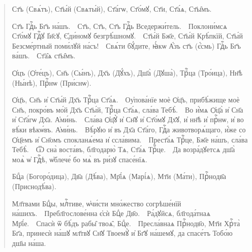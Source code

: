 \documentclass[11pt,a4paper,oneside]{memoir}
\newcommand{\exercise}{}
\newcommand{\exquote}{quote}
\newcommand{\pstyle}{\textenglish}
\newcommand{\pxp}[1]{\pstyle{(}#1\pstyle{)}}
\newcommand{\sdash}{\textenglish{\textemdash}}
\begin{document}
        \begin{\exquote}
          \begin{slv}
            Ст҃ъ \pxp{Свѧ́тъ}, Ст҃ы́й \pxp{Свѧты́й}, Ст҃а́гѡ,
            Ст҃о́мꙋ, Ст҃и, Ст҃а́ѧ, Ст҃ы̑мъ.

            Ст҃ъ Гдⷭ҇ь Бг҃ъ на́шъ.~\sdash~Ст҃ъ, Ст҃ъ, Ст҃ъ Гдⷭ҇ь
            Вседержи́тель.~\sdash~Поклони́мсѧ Ст҃о́мꙋ Гдⷭ҇ꙋ І҆и҃сꙋ,
            Є҆ди́номꙋ безгрѣ́шномꙋ.~\sdash~Ст҃ы́й Бж҃е, Ст҃ы́й
            Крѣ́пкїй, Ст҃ы́й Безсме́ртный поми́лꙋй
            на́съ!~\sdash~Свѧ́ти бꙋ́дите, ꙗ҆́кѡ А҆́зъ ст҃ъ
            \pxp{є҆́смь} Гдⷭ҇ь Бг҃ъ ва́шъ.~\sdash~Ст҃а̑ѧ ст҃ы̑мъ.

            Ѻ҆цъ \pxp{Ѻ҆те́цъ}, Сн҃ъ \pxp{Сы́нъ}, Дх҃ъ \pxp{Дꙋ́хъ},
            Дш҃а̀ \pxp{Дꙋша̀}, Трⷪ҇ца \pxp{Тро́ица}, Нн҃ѣ
            \pxp{Ны́нѣ}, Прⷭ҇нѡ \pxp{При́снѡ}.

            Ѻ҆ц҃ъ, Сн҃ъ и҆ Ст҃ы́й Дх҃ъ Трⷪ҇ца
            Ст҃а́ѧ.~\sdash~Оу҆пова́нїе моѐ Ѻ҆ц҃ъ, прибѣ́жище моѐ
            Сн҃ъ, покро́въ мо́й Дх҃ъ Ст҃ы́й, Трⷪ҇ца Ст҃а́ѧ, сла́ва
            Тебѣ̀.~\sdash~Во и҆́мѧ Ѻ҆ц҃а̀ и҆ Сн҃а и҆ Ст҃а́гѡ Дх҃а.
            А҆ми́нь.~\sdash~Сла́ва Ѻ҆ц҃ꙋ̀ и҆ Сн҃ꙋ и҆ Ст҃о́мꙋ Дх҃ꙋ, и҆
            нн҃ѣ и҆ прⷭ҇нѡ, и҆ во вѣ́ки вѣкѡ́въ.
            А҆ми́нь.~\sdash~Вѣ́рꙋю и҆ въ Дх҃а Ст҃а́го, Гдⷭ҇а
            животворѧ́щаго, и҆́же со Ѻ҆ц҃емъ и҆ Сн҃омъ спокланѧ́ема
            и҆ ссла́вима.~\sdash~Прест҃а́ѧ Трⷪ҇це, Бж҃е на́шъ, сла́ва
            Тебѣ̀.~\sdash~Ѿ сна̀ воста́въ, бл҃годарю̀ Тѧ, Ст҃а́ѧ
            Трⷪ҇це.~\sdash~Да возра́дꙋетсѧ дш҃а̀ моѧ̀ ѡ҆ Гдⷭ҇ѣ,
            ѡ҆блече́ бо мѧ̀ въ ри́зꙋ спасе́нїѧ.

            Бцⷣа \pxp{Богоро́дица}, Дв҃а \pxp{Дѣ́ва}, Мр҃і́ѧ
            \pxp{Марі́ѧ}, Мт҃и \pxp{Ма́ти}, Прⷭ҇нодв҃а \pxp{Приснодѣ́ва}.

            Мл҃твами Бцⷣы, млⷭ҇тиве, ѡ҆чи́сти мно́жество согрѣше́нїй
            на́шихъ.~\sdash~Пребл҃гослове́нна є҆сѝ Бцⷣе
            Дв҃о.~\sdash~Ра́дꙋйсѧ, бл҃года́тнаѧ Мр҃і́е.~\sdash~Спасѝ
            ѿ бѣ́дъ рабы̑ твоѧ̑, Бцⷣе.~\sdash~Пресла́внаѧ Прⷭ҇нодв҃о,
            Мт҃и Хрⷭ҇та̀ Бг҃а, принесѝ на́шꙋ мл҃твꙋ Сн҃ꙋ Твоемꙋ̀ и҆
            Бг҃ꙋ на́шемꙋ, да спасе́тъ Тобо́ю дш҃ы на́ша.
          \end{slv}
        \end{\exquote}
        \medskip

        \paragraph{\exercise}
\end{document}
